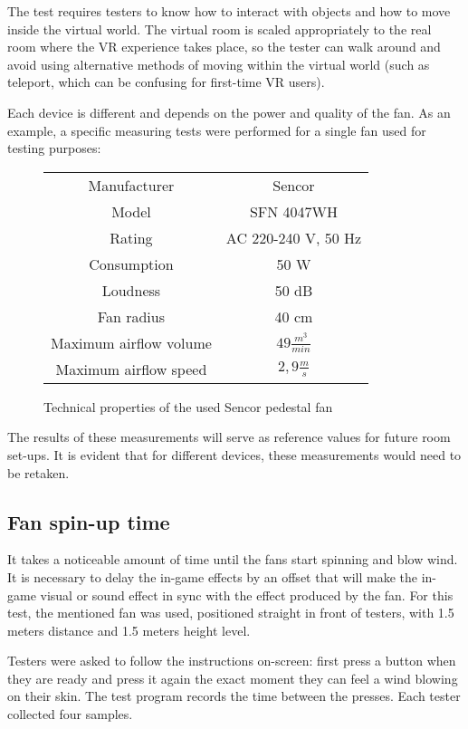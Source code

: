 The test requires testers to know how to interact with objects and how to move
inside the virtual world. The virtual room is scaled appropriately to the
real room where the VR experience takes place, so the tester can walk around
and avoid using alternative methods of moving within the virtual world
(such as teleport, which can be confusing for first-time VR users).


Each device is different and depends on the power and quality of the fan.
As an example, a specific measuring tests were performed for a single fan
used for testing purposes:

\begin{figure}
\begin{center}
\begin{tabular}{|c|c|}
\hline
Manufacturer & Sencor \\ 
Model & SFN 4047WH \\ 
Rating & AC 220-240 V, 50 Hz \\ 
Consumption & 50 W \\ 
Loudness & 50 dB \\ 
Fan radius & 40 cm \\ 
Maximum airflow volume & $ 49 \frac{m^3}{min} $ \\ 
Maximum airflow speed & $ 2,9 \frac{m}{s} $ \\ 
\hline
\end{tabular}
\end{center}
\caption{Technical properties of the used Sencor pedestal fan \cite{sencormanual}}
\end{figure}

The results of these measurements will serve as reference values for future
room set-ups. It is evident that for different devices, these measurements
would need to be retaken.


\hypertarget{x-fan-spin-up-time}{\subsection{Fan spin-up time}}
It takes a noticeable amount of time until the fans start spinning and
blow wind. It is necessary to delay the in-game effects by an offset that
will make the in-game visual or sound effect in sync with the effect
produced by the fan.
For this test, the mentioned fan was used, positioned straight in front of
testers, with 1.5 meters distance and 1.5 meters height level.


Testers were asked to follow the instructions on-screen: first press a button
when they are ready and press it again the exact moment they can feel a wind
blowing on their skin. The test program records the time between the presses.
Each tester collected four samples.


